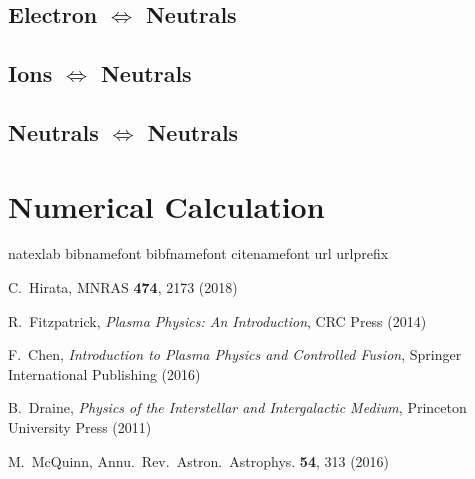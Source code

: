 \documentclass{article}
\begin{document}
\subsection{Electron $\Longleftrightarrow$ Neutrals}

\subsection{Ions $\Longleftrightarrow$ Neutrals}

\subsection{Neutrals $\Longleftrightarrow$ Neutrals}

\section{Numerical Calculation}

\label{section_model_comparision}


\begin{thebibliography}{95}
\expandafter\ifx\csname natexlab\endcsname\relax\def\natexlab#1{#1}\fi
\expandafter\ifx\csname bibnamefont\endcsname\relax
  \def\bibnamefont#1{#1}\fi
\expandafter\ifx\csname bibfnamefont\endcsname\relax
  \def\bibfnamefont#1{#1}\fi
\expandafter\ifx\csname citenamefont\endcsname\relax
  \def\citenamefont#1{#1}\fi
\expandafter\ifx\csname url\endcsname\relax
  \def\url#1{\texttt{#1}}\fi
\expandafter\ifx\csname urlprefix\endcsname\relax\def\urlprefix{URL }\fi
\providecommand{\bibinfo}[2]{#2}
\providecommand{\eprint}[2][]{\url{#2}}
  
  
	C.~Hirata,
	MNRAS {\bf 474}, 2173 (2018)

	R.~Fitzpatrick,
	\textit{Plasma Physics: An Introduction},
	CRC Press (2014)

	F.~Chen,
	\textit{Introduction to Plasma Physics and Controlled Fusion},
	Springer International Publishing (2016)

	B.~Draine,
	\textit{Physics of the Interstellar and Intergalactic Medium},
	Princeton University Press (2011)

	M.~McQuinn,
	Annu.\ Rev.\ Astron.\ Astrophys. {\bf 54}, 313 (2016)
 

\end{thebibliography}
\end{document}
